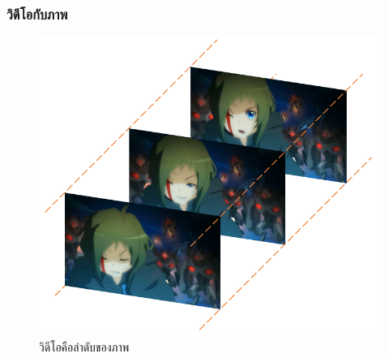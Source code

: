 \documentclass[xcolor=dvipsnames, xetex,serif]{beamer}
\numberwithin{equation}{section}
\begin{document}
		\begin{frame}
		\frametitle{วิดีโอกับภาพ}
			\begin{figure}[H]
				\centering
				\includegraphics[width=0.6\linewidth]{images/anime-frame.png}
				\caption{วิดีโอคือลำดับของภาพ}
			\end{figure}
		\end{frame}
\end{document}

